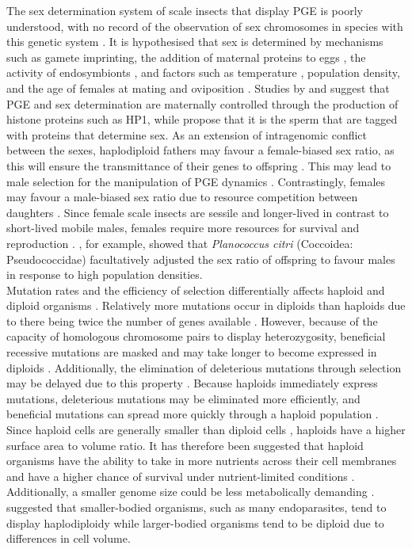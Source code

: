 The sex determination system of scale insects that display PGE is poorly understood, with no record of the observation of sex chromosomes in species with this genetic system \citep{Brown1964, Ross2010GenomicSystems}. It is hypothesised that sex is determined by mechanisms such as gamete imprinting, the addition of maternal proteins to eggs \citep{Ross2010GenomicSystems}, the activity of endosymbionts \citep{Buchner1965}, and factors such as temperature \citep{Nelson-Rees1962}, population density, and the age of females at mating and oviposition \citep{Ross2010b}. Studies by \citet{Sabour1972} and \citet{Bongiorni2007} suggest that PGE and sex determination are maternally controlled through the production of histone proteins such as HP1, while \citet{Buglia2004} propose that it is the sperm that are tagged with proteins that determine sex. As an extension of intragenomic conflict between the sexes, haplodiploid fathers may favour a female-biased sex ratio, as this will ensure the transmittance of their genes to offspring \citep{DelaFilia2015}. This may lead to male selection for the manipulation of PGE dynamics \citep{DelaFilia2015}. Contrastingly, females may favour a male-biased sex ratio due to resource competition between daughters \citep{Taylor1981}. Since female scale insects are sessile and longer-lived in contrast to short-lived mobile males, females require more resources for survival and reproduction \citep{Taylor1981, Ross2010b}. \citet{Ross2010GenomicSystems}, for example, showed that \textit{Planococcus citri} (Coccoidea: Pseudococcidae) facultatively adjusted the sex ratio of offspring to favour males in response to high population densities. \\
Mutation rates and the efficiency of selection differentially affects haploid and diploid organisms \citep{Otto2008}. Relatively more mutations occur in diploids than haploids due to there being twice the number of genes available \citep{Mable1998, Otto2008, DelaFilia2015}. However, because of the capacity of homologous chromosome pairs to display heterozygosity, beneficial recessive mutations are masked and may take longer to become expressed in diploids \citep{Mable1998}. Additionally, the elimination of deleterious mutations through selection may be delayed due to this property \citep{Otto2008}. Because haploids immediately express mutations, deleterious mutations may be eliminated more efficiently, and beneficial mutations can spread more quickly through a haploid population \citep{DelaFilia2015}. Since haploid cells are generally smaller than diploid cells \citep{Galitski1999}, haploids have a higher surface area to volume ratio. It has therefore been suggested that haploid organisms have the ability to take in more nutrients across their cell membranes and have a higher chance of survival under nutrient-limited conditions \citep{Lewis1985}. Additionally, a smaller genome size could be less metabolically demanding \citep{Lewis1985}. \citet{Cavalier-Smith1978} suggested that smaller-bodied organisms, such as many endoparasites, tend to display haplodiploidy while larger-bodied organisms tend to be diploid due to differences in cell volume. \\
